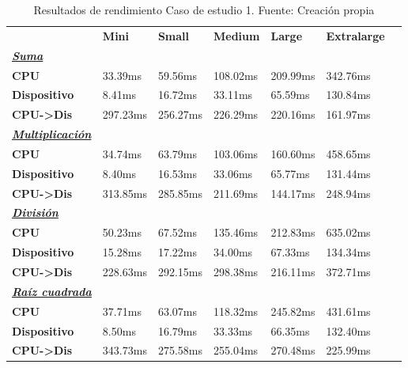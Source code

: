 \begin{table}[H]
    \centering
    \begin{tabular}{lllllll}
    \rowcolor[HTML]{DAE8FC} \ &  \textbf{Mini} &  \textbf{Small} &  \textbf{Medium} &  \textbf{	Large} &  \textbf{	Extralarge} \\
    \cellcolor[HTML]{DAE8FC} \textbf{\textbf{{\emph{{\underline{{Suma}}}}}}} &  &  &  & 	 & 	 \\
    \rowcolor[HTML]{EFEFEF} \cellcolor[HTML]{DAE8FC} \textbf{CPU} & 33.39ms & 59.56ms & 108.02ms & 	209.99ms & 	342.76ms \\
    \cellcolor[HTML]{DAE8FC} \textbf{Dispositivo} & 8.41ms & 16.72ms & 33.11ms & 	65.59ms & 	130.84ms \\
    \rowcolor[HTML]{EFEFEF} \cellcolor[HTML]{DAE8FC} \textbf{CPU->Dis} & 297.23ms & 256.27ms & 226.29ms & 	220.16ms & 	161.97ms \\
    \cellcolor[HTML]{DAE8FC} \textbf{\textbf{{\emph{{\underline{{Multiplicación}}}}}}} &  &  &  & 	 & 	 \\
    \rowcolor[HTML]{EFEFEF} \cellcolor[HTML]{DAE8FC} \textbf{CPU} & 34.74ms & 63.79ms & 103.06ms & 	160.60ms & 	458.65ms \\
    \cellcolor[HTML]{DAE8FC} \textbf{Dispositivo} & 8.40ms & 16.53ms & 33.06ms & 	65.77ms & 	131.44ms \\
    \rowcolor[HTML]{EFEFEF} \cellcolor[HTML]{DAE8FC} \textbf{CPU->Dis} & 313.85ms & 285.85ms & 211.69ms & 	144.17ms & 	248.94ms \\
    \cellcolor[HTML]{DAE8FC} \textbf{\textbf{{\emph{{\underline{{División}}}}}}} &  &  &  & 	 & 	 \\
    \rowcolor[HTML]{EFEFEF} \cellcolor[HTML]{DAE8FC} \textbf{CPU} & 50.23ms & 67.52ms & 135.46ms & 	212.83ms & 	635.02ms \\
    \cellcolor[HTML]{DAE8FC} \textbf{Dispositivo} & 15.28ms & 17.22ms & 34.00ms & 	67.33ms & 	134.34ms \\
    \rowcolor[HTML]{EFEFEF} \cellcolor[HTML]{DAE8FC} \textbf{CPU->Dis} & 228.63ms & 292.15ms & 298.38ms & 	216.11ms & 	372.71ms \\
    \cellcolor[HTML]{DAE8FC} \textbf{\textbf{{\emph{{\underline{{Raíz cuadrada}}}}}}} &  &  &  & 	 & 	 \\
    \rowcolor[HTML]{EFEFEF} \cellcolor[HTML]{DAE8FC} \textbf{CPU} & 37.71ms & 63.07ms & 118.32ms & 	245.82ms & 	431.61ms \\
    \cellcolor[HTML]{DAE8FC} \textbf{Dispositivo} & 8.50ms & 16.79ms & 33.33ms & 	66.35ms & 	132.40ms \\
    \rowcolor[HTML]{EFEFEF} \cellcolor[HTML]{DAE8FC} \textbf{CPU->Dis} & 343.73ms & 275.58ms & 255.04ms & 	270.48ms & 	225.99ms \\
    \end{tabular}
    \caption[Resultados de rendimiento Caso de estudio 1]{Resultados de rendimiento Caso de estudio 1. Fuente: Creación propia}
    \label{table_global_studyCase3_PerformanceResults}
\end{table}